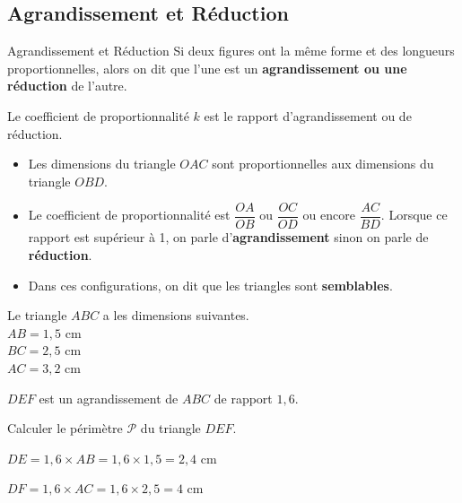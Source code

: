 \begin{pageCours}

\section{Agrandissement et Réduction}

\begin{DefT}{Agrandissement et Réduction}
Si	deux figures ont la même forme et des longueurs proportionnelles, 
alors on dit que l'une est un \textbf{agrandissement ou une réduction} de l'autre.
\end{DefT}

\begin{Rq}
Le coefficient de proportionnalité $k$ est le rapport d'agrandissement ou de réduction.
\end{Rq}

\begin{Rq} 
\begin{itemize}[leftmargin=*]
\item  Les dimensions du triangle $OAC$ sont proportionnelles aux dimensions du triangle $OBD$.
\item  Le coefficient de proportionnalité est $\dfrac{OA}{OB}$ ou $\dfrac{OC}{OD}$ ou encore $\dfrac{AC}{BD}$. Lorsque ce rapport est supérieur à 1, on parle d'\textbf{agrandissement} sinon on parle de \textbf{réduction}.
\item  Dans ces configurations, on dit que les triangles sont \textbf{semblables}.
\end{itemize}
\end{Rq}


\begin{ExCor}

\begin{minipage}{0.48\linewidth}
Le triangle $ABC$ a les dimensions suivantes.
\\$AB = 1,5$ cm
\\$BC = 2,5$ cm
\\$AC = 3,2$ cm

$DEF$ est un agrandissement de $ABC$ de rapport $1,6$. 

Calculer le périmètre $\mathcal{P}$ du triangle $DEF$.
\end{minipage}
\begin{minipage}{0.48\linewidth}
$DE = 1,6 \times AB = 1,6 \times 1,5 = 2,4$ cm

$DF = 1,6 \times AC = 1,6 \times 2,5 = 4$ cm


\end{minipage}
\end{ExCor}
\end{pageCours}
